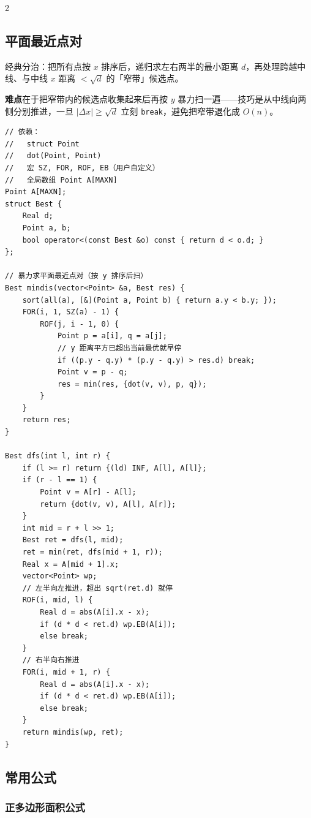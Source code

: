 \begin{multicols*}{2}
		\subsection{平面最近点对}

		经典分治：把所有点按 $x$ 排序后，递归求左右两半的最小距离 $d$，再处理跨越中线、与中线 $x$ 距离 $< \sqrt{d}$ 的「窄带」候选点。

		\textbf{难点}在于把窄带内的候选点收集起来后再按 $y$ 暴力扫一遍——技巧是从中线向两侧分别推进，一旦 $|\Delta x| \ge \sqrt{d}$ 立刻 \texttt{break}，避免把窄带退化成 $O(n)$。

		\begin{verbatim}
// 依赖：
//   struct Point
//   dot(Point, Point)
//   宏 SZ, FOR, ROF, EB（用户自定义）
//   全局数组 Point A[MAXN]
Point A[MAXN];
struct Best {
	Real d;
	Point a, b;
	bool operator<(const Best &o) const { return d < o.d; }
};

// 暴力求平面最近点对（按 y 排序后扫）
Best mindis(vector<Point> &a, Best res) {
	sort(all(a), [&](Point a, Point b) { return a.y < b.y; });
	FOR(i, 1, SZ(a) - 1) {
		ROF(j, i - 1, 0) {
			Point p = a[i], q = a[j];
			// y 距离平方已超出当前最优就早停
			if ((p.y - q.y) * (p.y - q.y) > res.d) break;
			Point v = p - q;
			res = min(res, {dot(v, v), p, q});
		}
	}
	return res;
}

Best dfs(int l, int r) {
	if (l >= r) return {(ld) INF, A[l], A[l]};
	if (r - l == 1) {
		Point v = A[r] - A[l];
		return {dot(v, v), A[l], A[r]};
	}
	int mid = r + l >> 1;
	Best ret = dfs(l, mid);
	ret = min(ret, dfs(mid + 1, r));
	Real x = A[mid + 1].x;
	vector<Point> wp;
	// 左半向左推进，超出 sqrt(ret.d) 就停
	ROF(i, mid, l) {
		Real d = abs(A[i].x - x);
		if (d * d < ret.d) wp.EB(A[i]);
		else break;
	}
	// 右半向右推进
	FOR(i, mid + 1, r) {
		Real d = abs(A[i].x - x);
		if (d * d < ret.d) wp.EB(A[i]);
		else break;
	}
	return mindis(wp, ret);
}
		\end{verbatim}

	\end{multicols*}

	\newpage

	\subsection{常用公式}

	\subsubsection{正多边形面积公式}

